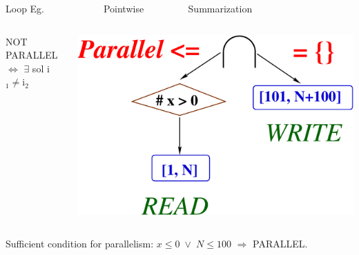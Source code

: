 \documentclass{beamer}
\newcommand{\mymath}[1]{$ #1 $}
\newcommand{\myindx}[1]{_{#1}}
\begin{document}
\begin{frame}[fragile,t]
\begin{block}{ Loop Eg.{\tt~~~~~~~~~~~~}Pointwise{\tt~~~~~~~~~}Summarization}
\begin{columns}
\begin{colorcode}[fontsize=\scriptsize]
NOT PARALLEL 
\mymath{\Leftrightarrow} \mymath{\exists} sol i\mymath{\myindx{1}\neq}i\mymath{\myindx{2}}
\end{colorcode}
%
\begin{center} \hspace{-4ex}
\includegraphics[height=13ex]{Figures/SimpleInd}
\end{center}
\end{columns}
\end{block}
 



Sufficient condition for parallelism: {\tt $x\leq 0$~$\vee$~$N \leq 100$} \mymath{\Rightarrow} PARALLEL.

\end{frame}
\end{document}
